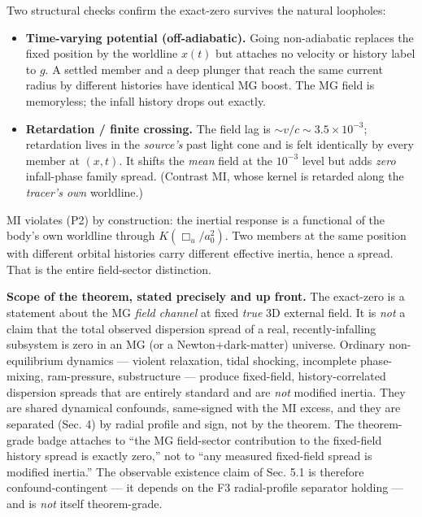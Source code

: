 \documentclass[
]{article}
\providecommand{\tightlist}{%
  \setlength{\itemsep}{0pt}\setlength{\parskip}{0pt}}
\begin{document}
Two structural checks confirm the exact-zero survives the natural
loopholes:

\begin{itemize}
\tightlist
\item
  \textbf{Time-varying potential (off-adiabatic).} Going non-adiabatic
  replaces the fixed position by the worldline \(x(t)\) but attaches no
  velocity or history label to \(g\). A settled member and a deep
  plunger that reach the same current radius by different histories have
  identical MG boost. The MG field is memoryless; the infall history
  drops out exactly.
\item
  \textbf{Retardation / finite crossing.} The field lag is
  \(\sim v/c\sim3.5\times10^{-3}\); retardation lives in the
  \emph{source's} past light cone and is felt identically by every
  member at \((x,t)\). It shifts the \emph{mean} field at the
  \(10^{-3}\) level but adds \emph{zero} infall-phase family spread.
  (Contrast MI, whose kernel is retarded along the \emph{tracer's own}
  worldline.)
\end{itemize}

MI violates (P2) by construction: the inertial response is a functional
of the body's own worldline through \(K(\Box_u/a_0^2)\). Two members at
the same position with different orbital histories carry different
effective inertia, hence a spread. That is the entire field-sector
distinction.

\textbf{Scope of the theorem, stated precisely and up front.} The
exact-zero is a statement about the MG \emph{field channel} at fixed
\emph{true} 3D external field. It is \emph{not} a claim that the total
observed dispersion spread of a real, recently-infalling subsystem is
zero in an MG (or a Newton+dark-matter) universe. Ordinary
non-equilibrium dynamics --- violent relaxation, tidal shocking,
incomplete phase-mixing, ram-pressure, substructure --- produce
fixed-field, history-correlated dispersion spreads that are entirely
standard and are \emph{not} modified inertia. They are shared dynamical
confounds, same-signed with the MI excess, and they are separated (Sec.
4) by radial profile and sign, not by the theorem. The theorem-grade
badge attaches to ``the MG field-sector contribution to the fixed-field
history spread is exactly zero,'' not to ``any measured fixed-field
spread is modified inertia.'' The observable existence claim of Sec. 5.1
is therefore confound-contingent --- it depends on the F3 radial-profile
separator holding --- and is \emph{not} itself theorem-grade.
\end{document}
